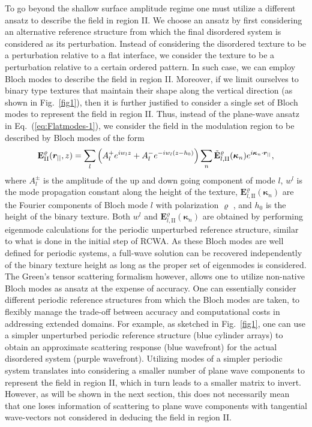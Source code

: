 \documentclass[ floatfix,reprint,amsmath,amssymb,aps,prb]{revtex4-1}
\begin{document}
\begin{widetext}
To go beyond the shallow surface amplitude regime one must utilize a different ansatz to describe the field in region II. We choose an ansatz by first considering an alternative reference structure from which the final disordered system is considered as its perturbation. Instead of considering the disordered texture to be a perturbation relative to a flat interface, we consider the texture to be a perturbation relative to a certain ordered pattern. In such case, we can employ Bloch modes to describe the field in region II. Moreover, if we limit ourselves to binary type textures that maintain their shape along the vertical direction (as shown in Fig.~\ref{fig1}), then it is further justified to consider a single set of Bloch modes to represent the field in region II.  Thus, instead of the plane-wave ansatz in Eq.~(\ref{eq:Flatmodes-1}), we consider the field in the modulation region to be described by Bloch modes of the form
\begin{equation}
    \mathbf{\mathbf{E}}_{\mathrm{II}}^{\varrho}(\boldsymbol{r}_{||},z)=   \sum_{l}\left(  A^+_{l}  e^{iw_{l}z}  +  A^-_{l} e^{-iw_{l}(z-h_0)}\right) \sum_{n} \Tilde{\mathbf{E}}^{\varrho}_{l,\mathrm{II}}(\boldsymbol{\kappa}_{n}) e^{i\boldsymbol{\kappa}_{n}\cdot\boldsymbol{r}_{||} }, \label{eq:Bloch}
\end{equation}
where $A^\pm_{l}$ is the amplitude of the up and down going component of mode $l$, $w^l$ is the mode propagation constant along the height of the texture, $\mathbf{E}^{\varrho}_{l,\mathrm{II}}(\boldsymbol{\kappa}_{n})$ are the Fourier components of Bloch mode $l$ with polarization $\varrho$ , and $h_0$ is the height of the binary texture\cite{Li:96}. Both $w^l$ and $\mathbf{E}^{\varrho}_{l,\mathrm{II}}(\boldsymbol{\kappa}_{n})$ are obtained by performing eigenmode calculations for the periodic unperturbed reference structure, similar to what is done in the initial step of RCWA\cite{Li:97,Popov:01,Caballero2012}. As these Bloch modes are well defined for periodic systems, a full-wave solution can be recovered independently of the binary texture height as long as the proper set of eigenmodes is considered. The Green's tensor scattering formalism however, allows one to utilize non-native Bloch modes as ansatz at the expense of accuracy. One can essentially consider different periodic reference structures from which the Bloch modes are taken, to flexibly manage the trade-off between accuracy and computational costs in addressing extended domains. For example, as sketched in Fig.~\ref{fig1}, one can use a simpler unperturbed periodic reference structure (blue cylinder arrays) to obtain an approximate scattering response (blue wavefront) for the actual disordered system (purple wavefront). Utilizing modes of a simpler periodic system translates into considering a smaller number of plane wave components to represent the field in region II, which in turn leads to a smaller matrix to invert. However, as will be shown in the next section, this does not necessarily mean that one loses information of scattering to plane wave components with tangential wave-vectors not considered in deducing the field in region II.


\end{widetext}
\end{document}
